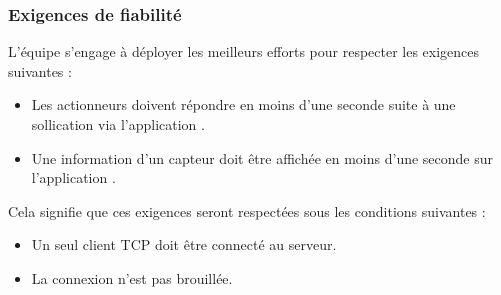 \subsubsection{Exigences de fiabilité}
L'équipe {\teamName} s'engage à déployer les meilleurs efforts pour respecter les exigences suivantes :
\begin{itemize}
    \item Les actionneurs doivent répondre en moins d'une seconde suite à une sollication via l'application {\nomApplication}.
    \item Une information d'un capteur doit être affichée en moins d'une seconde sur l'application {\nomApplication}.
\end{itemize}
Cela signifie que ces exigences seront respectées sous les conditions suivantes : 
\begin{itemize}
    \item Un seul client TCP doit être connecté au serveur.
    \item La connexion n'est pas brouillée.
\end{itemize}